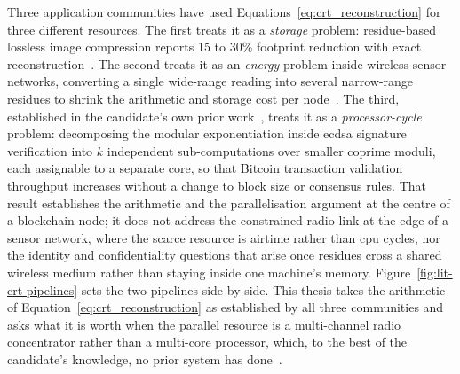 \documentclass[12pt,a4paper,oneside]{book}
\begin{document}
Three application communities have used
Equations~\ref{eq:crt_reconstruction} for three different resources. The
first treats it as a \emph{storage} problem: residue-based lossless image
compression reports 15 to 30\% footprint reduction with exact
reconstruction~\cite{vidhya2021crt, crtcompression2018}. The second treats
it as an \emph{energy} problem inside wireless sensor
networks, converting a single wide-range reading into several
narrow-range residues to shrink the arithmetic and storage cost per
node~\cite{rahman2022rnsenergy, khan2023fuzzycrt, djeddi2025parallelCRT}.
The third, established in the candidate's own prior
work~\cite{beloa2025bitcoincrt}, treats it as a \emph{processor-cycle}
problem: decomposing the modular exponentiation inside \gls{ecdsa}
signature verification into $k$ independent sub-computations over smaller
coprime moduli, each assignable to a separate core, so that Bitcoin
transaction validation throughput increases without a change to block size
or consensus rules. That result establishes the arithmetic and the
parallelisation argument at the centre of a blockchain node; it does not
address the constrained radio link at the edge of a sensor network, where
the scarce resource is airtime rather than \gls{cpu} cycles, nor the
identity and confidentiality questions that arise once residues cross a
shared wireless medium rather than staying inside one machine's memory.
Figure~\ref{fig:lit-crt-pipelines} sets the two pipelines side by side.
This thesis takes the arithmetic of Equation~\ref{eq:crt_reconstruction} as
established by all three communities and asks what it is worth when the
parallel resource is a multi-channel radio concentrator rather than a
multi-core processor, which, to the best of the candidate's knowledge, no
prior system has done~\cite{wang2018novel}.
\end{document}
